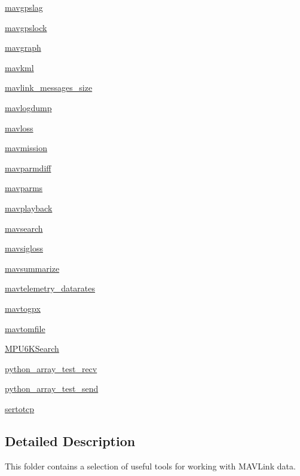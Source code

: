 \begin{DoxyCompactItemize}
\item 
 \mbox{\hyperlink{namespacepymavlink_1_1tools_1_1mavgpslag}{mavgpslag}}
\item 
 \mbox{\hyperlink{namespacepymavlink_1_1tools_1_1mavgpslock}{mavgpslock}}
\item 
 \mbox{\hyperlink{namespacepymavlink_1_1tools_1_1mavgraph}{mavgraph}}
\item 
 \mbox{\hyperlink{namespacepymavlink_1_1tools_1_1mavkml}{mavkml}}
\item 
 \mbox{\hyperlink{namespacepymavlink_1_1tools_1_1mavlink__messages__size}{mavlink\+\_\+messages\+\_\+size}}
\item 
 \mbox{\hyperlink{namespacepymavlink_1_1tools_1_1mavlogdump}{mavlogdump}}
\item 
 \mbox{\hyperlink{namespacepymavlink_1_1tools_1_1mavloss}{mavloss}}
\item 
 \mbox{\hyperlink{namespacepymavlink_1_1tools_1_1mavmission}{mavmission}}
\item 
 \mbox{\hyperlink{namespacepymavlink_1_1tools_1_1mavparmdiff}{mavparmdiff}}
\item 
 \mbox{\hyperlink{namespacepymavlink_1_1tools_1_1mavparms}{mavparms}}
\item 
 \mbox{\hyperlink{namespacepymavlink_1_1tools_1_1mavplayback}{mavplayback}}
\item 
 \mbox{\hyperlink{namespacepymavlink_1_1tools_1_1mavsearch}{mavsearch}}
\item 
 \mbox{\hyperlink{namespacepymavlink_1_1tools_1_1mavsigloss}{mavsigloss}}
\item 
 \mbox{\hyperlink{namespacepymavlink_1_1tools_1_1mavsummarize}{mavsummarize}}
\item 
 \mbox{\hyperlink{namespacepymavlink_1_1tools_1_1mavtelemetry__datarates}{mavtelemetry\+\_\+datarates}}
\item 
 \mbox{\hyperlink{namespacepymavlink_1_1tools_1_1mavtogpx}{mavtogpx}}
\item 
 \mbox{\hyperlink{namespacepymavlink_1_1tools_1_1mavtomfile}{mavtomfile}}
\item 
 \mbox{\hyperlink{namespacepymavlink_1_1tools_1_1MPU6KSearch}{M\+P\+U6\+K\+Search}}
\item 
 \mbox{\hyperlink{namespacepymavlink_1_1tools_1_1python__array__test__recv}{python\+\_\+array\+\_\+test\+\_\+recv}}
\item 
 \mbox{\hyperlink{namespacepymavlink_1_1tools_1_1python__array__test__send}{python\+\_\+array\+\_\+test\+\_\+send}}
\item 
 \mbox{\hyperlink{namespacepymavlink_1_1tools_1_1sertotcp}{sertotcp}}
\end{DoxyCompactItemize}


\subsection{Detailed Description}
\begin{DoxyVerb}This folder contains a selection of useful tools for working with MAVLink data.\end{DoxyVerb}
 